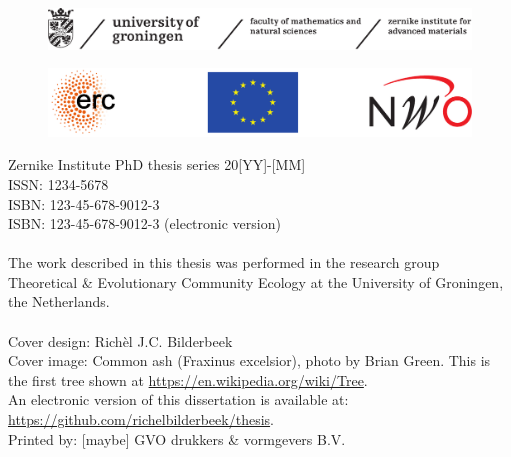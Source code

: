 \begin{titlepage}
%	

	
	
	
	
	\newpage \thispagestyle{empty}
	\vspace*{3.9cm}%
	
	
	\begin{figure}[!h]
		\includegraphics[width=\textwidth]{images/frontmatter/zernike.pdf}
	\end{figure}
	
	\vfill
	\begin{figure}[!h]
		\includegraphics[width=\textwidth]{images/frontmatter/all-logos.pdf}
	\end{figure}
	\noindent
	{\small 
		Zernike Institute PhD thesis series 20[YY]-[MM] \\
		ISSN: 1234-5678\\
		ISBN:	123-45-678-9012-3 \\
		ISBN: 123-45-678-9012-3 (electronic version) \\
		\\
		The work described in this thesis was performed in the research group 
    Theoretical \& Evolutionary Community Ecology at the University of Groningen, the Netherlands. \\
		\\
		Cover design: Rich\`el J.C. Bilderbeek\\
		Cover image: Common ash (Fraxinus excelsior), photo by Brian Green. 
    This is the first tree shown at \url{https://en.wikipedia.org/wiki/Tree}.
		\\
		An electronic version of this dissertation is available at: \\
	  \url{https://github.com/richelbilderbeek/thesis}. \\
		Printed by: [maybe] GVO drukkers \& vormgevers B.V. \\
		} 	
	
	
	\clearpage
	
	
	
\end{titlepage}
